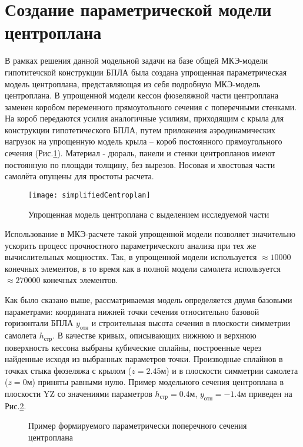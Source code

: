 \section{Создание параметрической модели центроплана}
\label{sec:creationOfModel}

В рамках решения данной модельной задачи на базе общей МКЭ-модели гипотитечской конструкции БПЛА была создана упрощенная параметрическая модель центроплана, представляющая из себя подробную МКЭ-модель центроплана. В упрощенной модели кессон фюзеляжной части центроплана заменен коробом переменного прямоугольного сечения с поперечными стенками. На короб передаются усилия аналогичные усилиям, приходящим с крыла для конструкции гипотетического БПЛА, путем приложения аэродинамических нагрузок на упрощенную модель крыла -- короб постоянного прямоугольного сечения (Рис.\ref{fig:CurvedKessonPatran}). Материал - дюраль, панели и стенки центропланов имеют постоянную по площади толщину, без вырезов. Носовая и хвостовая части самолёта опущены для простоты расчета.  



\begin{figure}[ht]
\centering
\texttt{[image: simplifiedCentroplan]}
\caption{Упрощенная модель центроплана с выделением исследуемой части}
\label{fig:CurvedKessonPatran}
\end{figure}

Использование в МКЭ-расчете такой упрощенной модели позволяет значительно ускорить процесс прочностного параметрического анализа при тех же вычислительных мощностях. Так, в упрощенной модели используется $\approx10000$ конечных элементов, в то время как в полной модели самолета используется $\approx270000$ конечных элементов.

Как было сказано выше, рассматриваемая модель определяется двумя базовыми параметрами: координата нижней точки сечения относительно базовой горизонтали БПЛА $y_\text{отн}$ и строительная высота сечения в плоскости симметрии самолета $h_\text{стр}$. В качестве кривых, описывающих нижнюю и верхнюю поверхность кессона выбраны кубические сплайны, построенные через найденные исходя из выбранных параметров точки. Производные сплайнов в точках стыка фюзеляжа с крылом ($z=2.45\text{м}$) и в плоскости симметрии самолета ($z=0\text{м}$) приняты равными нулю. Пример модельного сечения центроплана в плоскости YZ со значениями параметров $h_\text{стр}=0.4\text{м}$, $y_\text{отн} = -1.4\text{м}$ приведен на Рис.\ref{fig:KessSectionExample}.

\begin{figure}[ht]
\centering
\def\svgwidth{\textwidth}

\caption{Пример формируемого параметрически поперечного сечения центроплана}
\label{fig:KessSectionExample}
\end{figure}

